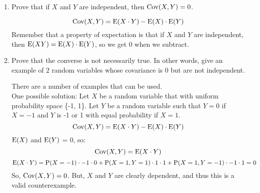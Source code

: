 \question 
\begin{enumerate}[label=(\alph*)]
\item Prove that if $X$ and $Y$ are independent, then $\text{Cov}(X, Y) = 0$.
\begin{solution}[.75cm]
	\[\text{Cov}(X, Y) = \text{E}(X \cdot Y) - \text{E}(X) \cdot \text{E}(Y)\]
Remember that a property of expectation is that if $X$ and $Y$ are 
independent, then $\text{E}(XY) = \text{E}(X) \cdot \text{E}(Y)$, so we get 0 when we subtract. 
\end{solution}
\item Prove that the converse is not necessarily true. In other words, give an example of $2$ random variables whose covariance is $0$ but are not independent.
\begin{solution}[1cm]
There are a number of examples that can be used. \\
One possible solution: Let $X$ be a random variable that with uniform probability space \{-1, 1\}. Let $Y$ be a random variable such that $Y = 0$ if $X = -1$ and $Y$ is -1 or 1 with equal probability if $X = 1$. \\
\[\text{Cov}(X, Y) = \text{E}(X \cdot Y) - \text{E}(X) \cdot \text{E}(Y)\]
$\text{E}(X)$ and $\text{E}(Y)$ = 0, so: 
\[\text{Cov}(X, Y) = \text{E}(X \cdot Y)\]
\[\text{E}(X \cdot Y) = \text{P}(X = -1) \cdot -1 \cdot 0 + \text{P}(X = 1, Y = 1) \cdot 1 \cdot 1 + \text{P}(X = 1, Y = -1) \cdot -1 \cdot 1 = 0\]
So, $\text{Cov}(X, Y) = 0$. But, $X$ and $Y$ are clearly dependent, and thus this is a valid counterexample. 

	\begin{comment}
	Let $X \mathtt{\sim} U(-1, 1)$ and let $Y = X^2$ \newline
	
	We have $E[X] = \frac{-1+1}{2} = 0$ \newline
	The pdf of $X$ is $\frac{1}{2}$, so \newline 
	$E[Y] = E[X^2] = \int\limits_{-1}^{1}x^2f_X(x) dx = \int\limits_{-1}^{1}\frac{1}{2}x^2 = \frac{1}{3}$ \newline
	We also have $E[XY] = E[X * X^2] = E[X^3] = \int\limits_{-1}^{1}x^3f_X(x) dx
	=  \int\limits_{-1}^{1}\frac{1}{2}x^3 dx  = 0$ \newline
	cov$(X, Y) = E[XY] - E[X]E[Y] = 0 - 0 * \frac{1}{3} = 0$ \newline
	However, $Y$ is clearly dependent on $X$ as $Y = X^2$, and thus we provide a valid counterexample. 
	\end{comment}
\end{solution}
\end{enumerate}